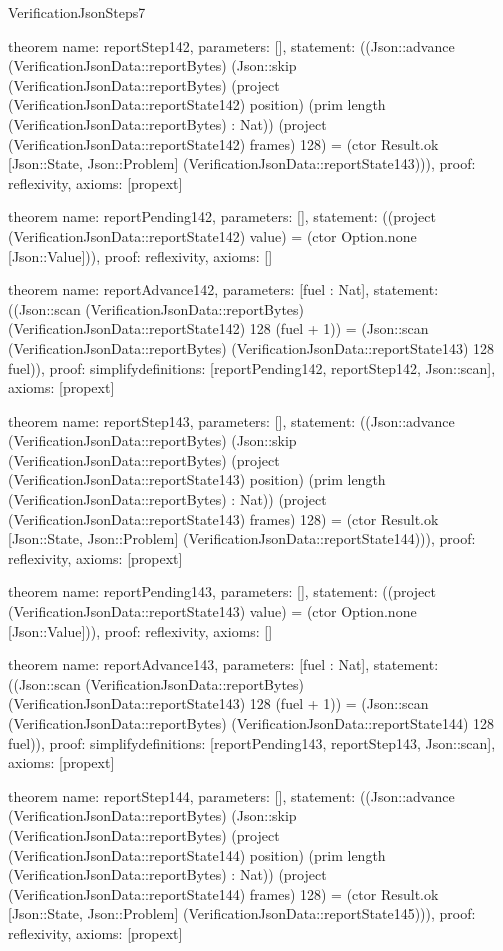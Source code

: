 \begin{lexlean}{VerificationJsonSteps7}
\begin{semanticmodule}
theorem{
  name: reportStep142,
  parameters: [],
  statement: ((Json::advance (VerificationJsonData::reportBytes) (Json::skip (VerificationJsonData::reportBytes) (project (VerificationJsonData::reportState142) position) (prim length (VerificationJsonData::reportBytes) : Nat)) (project (VerificationJsonData::reportState142) frames) 128) = (ctor Result.ok [Json::State, Json::Problem] (VerificationJsonData::reportState143))),
  proof: reflexivity{},
  axioms: [propext]
}

theorem{
  name: reportPending142,
  parameters: [],
  statement: ((project (VerificationJsonData::reportState142) value) = (ctor Option.none [Json::Value])),
  proof: reflexivity{},
  axioms: []
}

theorem{
  name: reportAdvance142,
  parameters: [fuel : Nat],
  statement: ((Json::scan (VerificationJsonData::reportBytes) (VerificationJsonData::reportState142) 128 (fuel + 1)) = (Json::scan (VerificationJsonData::reportBytes) (VerificationJsonData::reportState143) 128 fuel)),
  proof: simplify{definitions: [reportPending142, reportStep142, Json::scan]},
  axioms: [propext]
}

theorem{
  name: reportStep143,
  parameters: [],
  statement: ((Json::advance (VerificationJsonData::reportBytes) (Json::skip (VerificationJsonData::reportBytes) (project (VerificationJsonData::reportState143) position) (prim length (VerificationJsonData::reportBytes) : Nat)) (project (VerificationJsonData::reportState143) frames) 128) = (ctor Result.ok [Json::State, Json::Problem] (VerificationJsonData::reportState144))),
  proof: reflexivity{},
  axioms: [propext]
}

theorem{
  name: reportPending143,
  parameters: [],
  statement: ((project (VerificationJsonData::reportState143) value) = (ctor Option.none [Json::Value])),
  proof: reflexivity{},
  axioms: []
}

theorem{
  name: reportAdvance143,
  parameters: [fuel : Nat],
  statement: ((Json::scan (VerificationJsonData::reportBytes) (VerificationJsonData::reportState143) 128 (fuel + 1)) = (Json::scan (VerificationJsonData::reportBytes) (VerificationJsonData::reportState144) 128 fuel)),
  proof: simplify{definitions: [reportPending143, reportStep143, Json::scan]},
  axioms: [propext]
}

theorem{
  name: reportStep144,
  parameters: [],
  statement: ((Json::advance (VerificationJsonData::reportBytes) (Json::skip (VerificationJsonData::reportBytes) (project (VerificationJsonData::reportState144) position) (prim length (VerificationJsonData::reportBytes) : Nat)) (project (VerificationJsonData::reportState144) frames) 128) = (ctor Result.ok [Json::State, Json::Problem] (VerificationJsonData::reportState145))),
  proof: reflexivity{},
  axioms: [propext]
}


\end{semanticmodule}
\end{lexlean}
